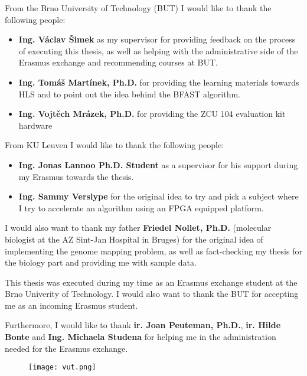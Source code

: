 From the Brno University of Technology (BUT) I would like to thank the following people:
\begin{itemize}
	\item \textbf{Ing. V\'aclav \v Simek} as my supervisor for providing feedback on the process of executing this thesis, as well as helping with the administrative side of the Erasmus exchange and recommending courses at BUT.
	\item \textbf{Ing. Tom\'a\v s Mart\'inek, Ph.D.} for providing the learning materials towards HLS and to point out the idea behind the BFAST algorithm.
	\item \textbf{Ing. Vojt\v ech Mr\'azek, Ph.D.} for providing the ZCU 104 evaluation kit hardware
\end{itemize}

From KU Leuven I would like to thank the following people:
\begin{itemize}
	\item \textbf{Ing. Jonas Lannoo
		Ph.D. Student} as a supervisor for his support during my Erasmus towards the thesis.
	\item \textbf{Ing. Sammy Verslype} for the original idea to try and pick a subject where I try to accelerate an algorithm using an FPGA equipped platform.
\end{itemize} 

I would also want to thank my father \textbf{Friedel Nollet, Ph.D.} (molecular biologist at the AZ Sint-Jan Hospital in Bruges) for the original idea of implementing the genome mapping problem, as well as fact-checking my thesis for the biology part and providing me with sample data.

This thesis was executed during my time as an Erasmus exchange student at the Brno Univerity of Technology. I would also want to thank the BUT for accepting me as an incoming Erasmus student.

Furthermore, I would like to thank \textbf{ir. Joan Peuteman, Ph.D.}, \textbf{ir. Hilde Bonte} and \textbf{Ing. Michaela Studena} for helping me in the administration needed for the Erasmus exchange.

\begin{figure}[H]
	\centering
	\texttt{[image: vut.png]}
\end{figure}